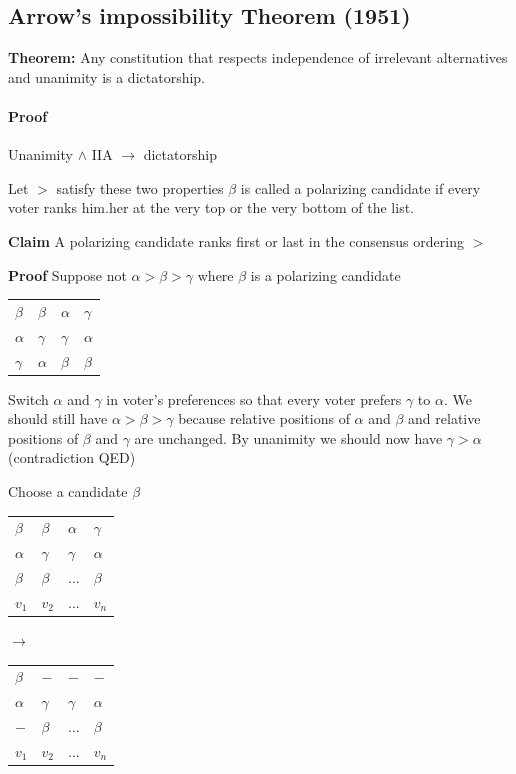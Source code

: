 \documentclass[9pt, letterpaper, oneside]{article}
\begin{document}
\subsection{Arrow's impossibility Theorem (1951)} 
\textbf{Theorem:} Any constitution that respects independence of irrelevant alternatives and unanimity is a dictatorship.

\paragraph{Proof}

Unanimity $\wedge$ IIA $\to$ dictatorship

Let $>$ satisfy these two properties $\beta$ is called a polarizing candidate if every voter ranks him.her at the very top or the very bottom of the list.

\textbf{Claim} A polarizing candidate ranks first or last in the consensus ordering $>$

\textbf{Proof} Suppose not $\alpha > \beta > \gamma $ where $\beta$ is a polarizing candidate

\begin{tabular}{| l | l | l | l | }
  $\beta$ & $\beta$ & $\alpha$  & $\gamma$\\
  $\alpha$ & $\gamma$ & $\gamma$  & $\alpha$\\
  $\gamma$ & $\alpha$ & $\beta$  & $\beta$\\
\end{tabular}

Switch $\alpha$ and $\gamma$ in voter's preferences so that every voter prefers $\gamma$ to $\alpha$. We should still have $\alpha > \beta > \gamma$ because relative positions of $\alpha$ and $\beta$ and relative positions of $\beta$ and $\gamma$ are unchanged. By unanimity we should now have $\gamma > \alpha$ (contradiction QED)


Choose a candidate $\beta$

\begin{tabular}{| l | l | l | l | }
  $\beta$ & $\beta$ & $\alpha$  & $\gamma$\\
  $\alpha$ & $\gamma$ & $\gamma$  & $\alpha$\\
  $\beta$ & $\beta$ & $...$  & $\beta$\\
  $v_1$ & $v_2$ & $...$  & $v_n$\\
\end{tabular}
$\to$
\begin{tabular}{| l | l | l | l | }
  $\beta$ & $-$ & $-$  & $-$\\
  $\alpha$ & $\gamma$ & $\gamma$  & $\alpha$\\
  $-$ & $\beta$ & $...$  & $\beta$\\
  $v_1$ & $v_2$ & $...$  & $v_n$\\
\end{tabular}
\end{document}
